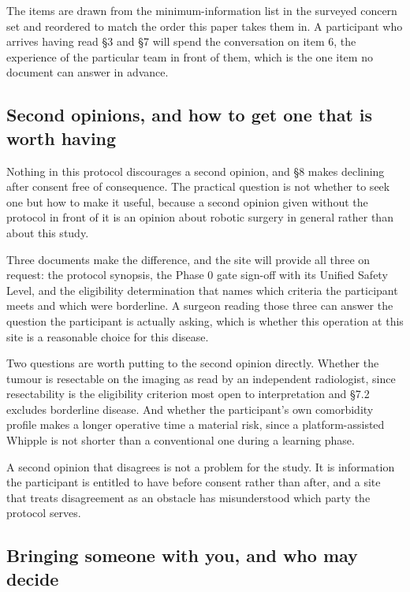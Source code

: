 \vspace{0.30em}

\noindent The items are drawn from the minimum-information list in the surveyed
concern set \cite{WuSemiAI2026, NCIConsent24, FDATrans2024} and reordered to
match the order this paper takes them in. A participant who arrives having read
\S 3 and \S 7 will spend the conversation on item 6, the experience of the
particular team in front of them, which is the one item no document can answer
in advance.

\subsection{Second opinions, and how to get one that is worth having}

Nothing in this protocol discourages a second opinion, and \S 8 makes declining
after consent free of consequence. The practical question is not whether to seek
one but how to make it useful, because a second opinion given without the
protocol in front of it is an opinion about robotic surgery in general rather
than about this study.

Three documents make the difference, and the site will provide all three on
request: the protocol synopsis, the Phase 0 gate sign-off with its Unified
Safety Level, and the eligibility determination that names which criteria the
participant meets and which were borderline. A surgeon reading those three can
answer the question the participant is actually asking, which is whether this
operation at this site is a reasonable choice for this disease.

Two questions are worth putting to the second opinion directly. Whether the
tumour is resectable on the imaging as read by an independent radiologist, since
resectability is the eligibility criterion most open to interpretation and \S 7.2
excludes borderline disease. And whether the participant's own comorbidity
profile makes a longer operative time a material risk, since a platform-assisted
Whipple is not shorter than a conventional one during a learning phase.

A second opinion that disagrees is not a problem for the study. It is
information the participant is entitled to have before consent rather than
after, and a site that treats disagreement as an obstacle has misunderstood
which party the protocol serves.

\subsection{Bringing someone with you, and who may decide}

